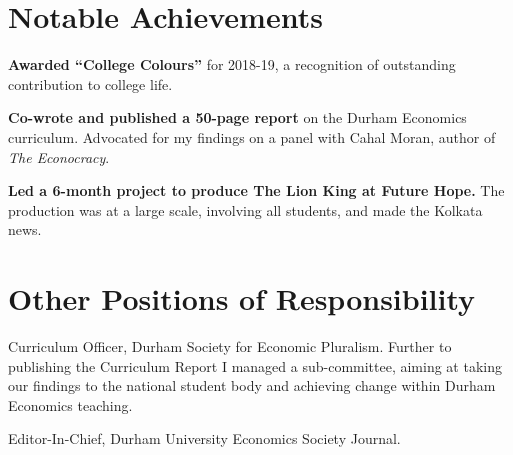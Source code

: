 \documentclass[a4]{article}
\renewenvironment{itemize}{
  \begin{list}{}{
    \setlength{\leftmargin}{1.5em}
  }
}{
  \end{list}
}
\begin{document}
\section*{Notable Achievements}
\begin{itemize}
\item \textbf{Awarded ``College Colours''} for 2018-19, a recognition of outstanding contribution to college life.
\item \textbf{Co-wrote and published a 50-page report} on the Durham Economics curriculum. Advocated for my findings on a panel with Cahal Moran, author of \textit{The Econocracy}.
\item \textbf{Led a 6-month project to produce The Lion King at Future Hope.} The production was at a large scale, involving all students, and made the Kolkata news.
\end{itemize}

\section*{Other Positions of Responsibility}
\begin{itemize}
	\item Curriculum Officer, Durham Society for Economic Pluralism. Further to publishing the Curriculum Report I managed a sub-committee, aiming at taking our findings to the national student body and achieving change within Durham Economics teaching.
\item Editor-In-Chief, Durham University Economics Society Journal.

\end{itemize}


\end{document}
